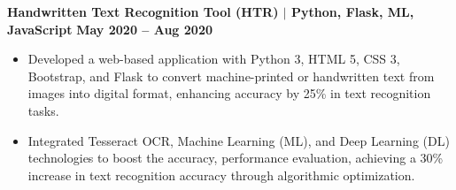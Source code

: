 \documentclass{article}
\begin{document}
\textbf{\textbf{Handwritten Text Recognition Tool (HTR) } $\mid$ \textbf{Python, Flask, ML, JavaScript} } \hfill \textbf{\textbf{May 2020 – Aug 2020} }
\begin{itemize}[noitemsep,nolistsep,leftmargin=*]
    \item Developed a web-based application with Python 3, HTML 5, CSS 3, Bootstrap, and Flask to convert machine-printed or handwritten text from images into digital format, enhancing accuracy by 25\% in text recognition tasks.
    \item Integrated Tesseract OCR, Machine Learning (ML), and Deep Learning (DL) technologies to boost the accuracy, performance evaluation, achieving a 30\% increase in text recognition accuracy through algorithmic optimization.
\end{itemize}







\end{document}
